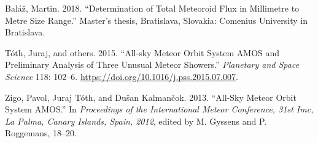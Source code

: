 \hypertarget{refs}{}
\hypertarget{ref-balaz2018}{}
Baláž, Martin. 2018. ``Determination of Total Meteoroid Flux in
Millimetre to Metre Size Range.'' Master's thesis, Bratislava, Slovakia:
Comenius University in Bratislava.

\hypertarget{ref-toth2015}{}
Tóth, Juraj, and others. 2015. ``All-sky Meteor Orbit System AMOS and
Preliminary Analysis of Three Unusual Meteor Showers.'' \emph{Planetary
and Space Science} 118: 102--6.
\url{https://doi.org/10.1016/j.pss.2015.07.007}.

\hypertarget{ref-zigo2013}{}
Zigo, Pavol, Juraj Tóth, and Dušan Kalmančok. 2013. ``All-Sky Meteor
Orbit System AMOS.'' In \emph{Proceedings of the International Meteor
Conference, 31st Imc, La Palma, Canary Islands, Spain, 2012}, edited by
M. Gyssens and P. Roggemans, 18--20.
